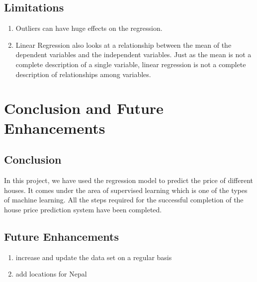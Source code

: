 \section{Limitations}
\vspace{-18pt}
\begin{enumerate}
\item  Outliers can have huge effects on the regression.
\item Linear Regression also looks at a relationship between the mean of the dependent variables and the independent variables. Just as the mean is not a complete description of a single variable, linear regression is not a complete description of relationships among variables.
\end{enumerate} 
\chapter{Conclusion and Future Enhancements}
\vspace{-18pt}
\section{Conclusion}
\vspace{-18pt}
In this project, we have used the regression model to predict the price of different houses. It comes under the area of supervised learning which is one of the types of machine learning. All the steps required for the successful completion of the house price prediction system have been completed.
\section{Future Enhancements}
\vspace{-18pt}
\begin{enumerate}
\item increase and update the data set on a regular basis
\item add locations for Nepal
\end{enumerate}
\renewcommand\bibname{References} %

